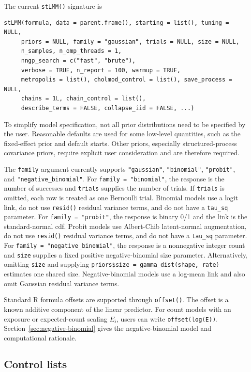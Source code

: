 \documentclass[11pt]{article}
\begin{document}
The current \texttt{stLMM()} signature is
\begin{verbatim}
stLMM(formula, data = parent.frame(), starting = list(), tuning = NULL,
     priors = NULL, family = "gaussian", trials = NULL, size = NULL,
     n_samples, n_omp_threads = 1,
     nngp_search = c("fast", "brute"),
     verbose = TRUE, n_report = 100, warmup = TRUE,
     metropolis = list(), cholmod_control = list(), save_process = NULL,
     chains = 1L, chain_control = list(),
     describe_terms = FALSE, collapse_iid = FALSE, ...)
\end{verbatim}

To simplify model specification, not all prior distributions need to be specified by the user. Reasonable defaults are used for some low-level quantities, such as the fixed-effect prior and default starts. Other priors, especially structured-process covariance priors, require explicit user consideration and are therefore required.

The \texttt{family} argument currently supports \texttt{"gaussian"}, \texttt{"binomial"}, \texttt{"probit"}, and \texttt{"negative\_binomial"}. For \texttt{family = "binomial"}, the response is the number of successes and \texttt{trials} supplies the number of trials. If \texttt{trials} is omitted, each row is treated as one Bernoulli trial. Binomial models use a logit link, do not use \texttt{resid()} residual variance terms, and do not have a \texttt{tau\_sq} parameter. For \texttt{family = "probit"}, the response is binary 0/1 and the link is the standard-normal cdf. Probit models use Albert-Chib latent-normal augmentation, do not use \texttt{resid()} residual variance terms, and do not have a \texttt{tau\_sq} parameter. For \texttt{family = "negative\_binomial"}, the response is a nonnegative integer count and \texttt{size} supplies a fixed positive negative-binomial size parameter. Alternatively, omitting \texttt{size} and supplying \texttt{priors\$size = gamma\_dist(shape, rate)} estimates one shared size. Negative-binomial models use a log-mean link and also omit Gaussian residual variance terms.

Standard R formula offsets are supported through \texttt{offset()}. The offset is a known additive component of the linear predictor. For count models with an exposure or expected-count scaling $E_i$, users can write \texttt{offset(log(E))}. Section~\ref{sec:negative-binomial} gives the negative-binomial model and computational rationale.

\subsection{Control lists}
\end{document}
